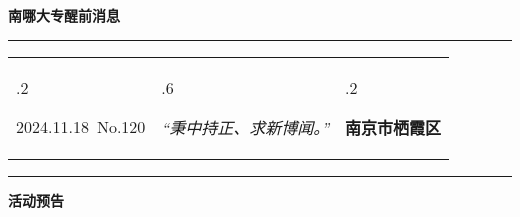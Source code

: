 \documentclass[letterpaper, 12pt]{article}
\begin{document}
\begin{center}
    \Huge\textbf{南哪大专醒前消息}
\end{center}
\vspace{4mm}
\hrule
\renewcommand\tabularxcolumn[1]{m{#1}}
\begin{tabularx}{\textwidth}{>{\hsize.2\hsize}X>{\hsize.6\hsize}X>{\hsize.2\hsize}X}
    \begin{flushleft}
        2024.11.18\, No.120
    \end{flushleft}
    &
    \begin{center}
        \textit{“秉中持正、求新博闻。”}
    \end{center}
    &
    \begin{flushright}
        \textbf{南京市栖霞区}
    \end{flushright}
\end{tabularx}
\vspace{-3.5mm}
\hrule
\vspace{4mm}
\centerline{\huge\textbf{活动预告}}
\end{document}

